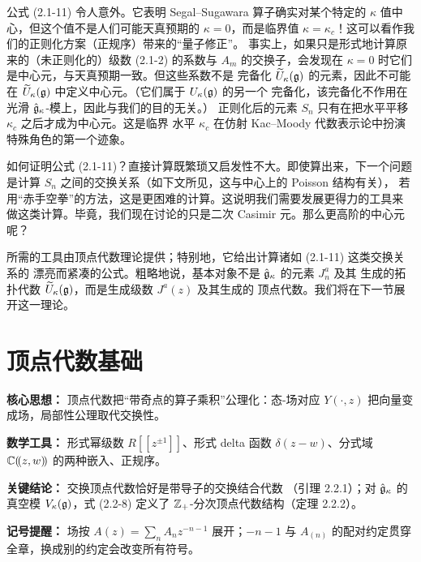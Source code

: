 公式 (2.1-11) 令人意外。它表明 Segal--Sugawara 算子确实对某个特定的
$\kappa$ 值中心，但这个值不是人们可能天真预期的 $\kappa=0$，而是临界值
$\kappa=\kappa_c$！这可以看作我们的正则化方案（正规序）带来的“量子修正”。
事实上，如果只是形式地计算原来的（未正则化的）级数 (2.1-2) 的系数与 $A_m$
的交换子，会发现在 $\kappa=0$ 时它们是中心元，与天真预期一致。但这些系数不是
完备化 $\widetilde U_\kappa(\mathfrak{g})$ 的元素，因此不可能在
$\widetilde U_\kappa(\mathfrak{g})$ 中定义中心元。（它们属于 $U_\kappa(\mathfrak{g})$ 的另一个
完备化，该完备化不作用在光滑 $\hat{\mathfrak{g}}_\kappa$-模上，因此与我们的目的无关。）
正则化后的元素 $S_n$ 只有在把水平平移 $\kappa_c$ 之后才成为中心元。这是临界
水平 $\kappa_c$ 在仿射 Kac--Moody 代数表示论中扮演特殊角色的第一个迹象。

如何证明公式 (2.1-11)？直接计算既繁琐又启发性不大。即使算出来，下一个问题
是计算 $S_n$ 之间的交换关系（如下文所见，这与中心上的 Poisson 结构有关），
若用“赤手空拳”的方法，这是更困难的计算。这说明我们需要发展更得力的工具来
做这类计算。毕竟，我们现在讨论的只是二次 Casimir 元。那么更高阶的中心元呢？

所需的工具由顶点代数理论提供；特别地，它给出计算诸如 (2.1-11) 这类交换关系的
漂亮而紧凑的公式。粗略地说，基本对象不是 $\hat{\mathfrak{g}}_\kappa$ 的元素 $J^a_n$ 及其
生成的拓扑代数 $\widetilde U_\kappa(\mathfrak{g})$，而是生成级数 $J^a(z)$ 及其生成的
顶点代数。我们将在下一节展开这一理论。

\section{顶点代数基础}

\setcounter{theorem}{0}

\begin{keypoints}
    \item \textbf{核心思想：} 顶点代数把“带奇点的算子乘积”公理化：态-场对应
    $Y(\cdot,z)$ 把向量变成场，局部性公理取代交换性。
    \item \textbf{数学工具：} 形式幂级数 $R[[z^{\pm1}]]$、形式 delta 函数
    $\delta(z-w)$、分式域 $\mathbb{C}(\!(z,w)\!)$ 的两种嵌入、正规序。
    \item \textbf{关键结论：} 交换顶点代数恰好是带导子的交换结合代数
    （引理 2.2.1）；对 $\hat{\mathfrak{g}}_\kappa$ 的真空模 $V_\kappa(\mathfrak{g})$，式 (2.2-8)
    定义了 $\mathbb{Z}_+$-分次顶点代数结构（定理 2.2.2）。
    \item \textbf{记号提醒：} 场按 $A(z)=\sum_n A_nz^{-n-1}$ 展开；$-n-1$ 与
    $A_{(n)}$ 的配对约定贯穿全章，换成别的约定会改变所有符号。
\end{keypoints}

